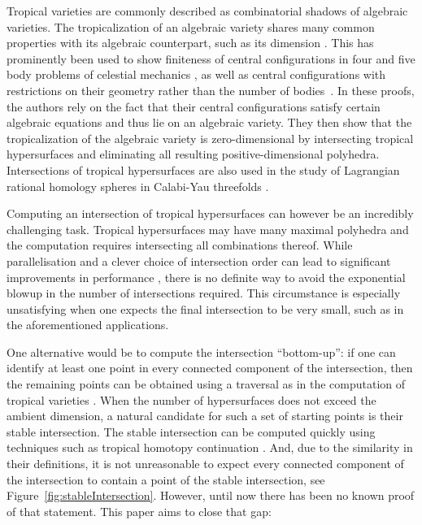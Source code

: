 \documentclass[11pt]{article}
\theoremstyle{definition}
\numberwithin{equation}{section}
\begin{document}
Tropical varieties are commonly described as combinatorial shadows of algebraic varieties. The tropicalization of an algebraic variety shares many common properties with its algebraic counterpart, such as its dimension \cite[Structure Theorem 3.3.5]{MaclaganSturmfels15}. This has prominently been used to show finiteness of central configurations in four and five body problems of celestial mechanics \cite{HamptonMoeckel06,HamptonJensen11}, as well as central configurations with restrictions on their geometry rather than the number of bodies~\cite{HamptonJensen15,DengHampton23}. In these proofs, the authors rely on the fact that their central configurations satisfy certain algebraic equations and thus lie on an algebraic variety. They then show that the tropicalization of the algebraic variety is zero-dimensional by intersecting tropical hypersurfaces and eliminating all resulting positive-dimensional polyhedra. Intersections of tropical hypersurfaces are also used in the study of Lagrangian rational homology spheres in Calabi-Yau threefolds \cite{MakRuddat20}.

Computing an intersection of tropical hypersurfaces can however be an incredibly challenging task. Tropical hypersurfaces may have many maximal polyhedra and the computation requires intersecting all combinations thereof. While parallelisation and a clever choice of intersection order can lead to significant improvements in performance \cite{JSV17}, there is no definite way to avoid the exponential blowup in the number of intersections required. This circumstance is especially unsatisfying when one expects the final intersection to be very small, such as in the aforementioned applications.

One alternative would be to compute the intersection ``bottom-up'': if one can identify at least one point in every connected component of the intersection, then the remaining points can be obtained using a traversal as in the computation of tropical varieties \cite{BJST07,MR20}. When the number of hypersurfaces does not exceed the ambient dimension, a natural candidate for such a set of starting points is their stable intersection. The stable intersection can be computed quickly using techniques such as tropical homotopy continuation \cite{Jensen16}. And, due to the similarity in their definitions, it is not unreasonable to expect every connected component of the intersection to contain a point of the stable intersection, see Figure~\ref{fig:stableIntersection}. However, until now there has been no known proof of that statement. This paper aims to close that gap:
\end{document}
